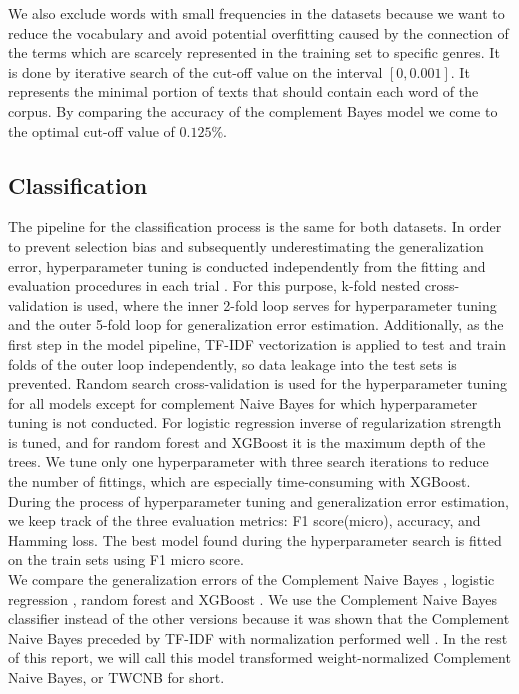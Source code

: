 \documentclass{article}
\begin{document}
We also exclude words with small frequencies in the datasets because we want to reduce the vocabulary and avoid potential overfitting caused by the connection of the terms which are scarcely represented in the training set to specific genres. It is done by iterative search of the cut-off value on the interval $[0, 0.001]$. It represents the minimal portion of texts that should contain each word of the corpus. By comparing the accuracy of the complement Bayes model we come to the optimal cut-off value of $0.125\%$.

\subsection{Classification}

The pipeline for the classification process is the same for both datasets. In order to prevent selection bias and subsequently underestimating the generalization error, hyperparameter tuning is conducted independently from the fitting and evaluation procedures in each trial \cite{cawley2010over}. For this purpose, k-fold nested cross-validation is used, where the inner 2-fold loop serves for hyperparameter tuning and the outer 5-fold loop for generalization error estimation. Additionally, as the first step in the model pipeline, TF-IDF vectorization is applied to test and train folds of the outer loop independently, so data leakage into the test sets is prevented. Random search cross-validation is used for the hyperparameter tuning for all models except for complement Naive Bayes for which hyperparameter tuning is not conducted. For logistic regression inverse of regularization strength is tuned, and for random forest and XGBoost it is the maximum depth of the trees. We tune only one hyperparameter with three search iterations to reduce the number of fittings, which are especially time-consuming with XGBoost. During the process of hyperparameter tuning and generalization error estimation, we keep track of the three evaluation metrics: F1 score(micro), accuracy, and Hamming loss. The best model found during the hyperparameter search is fitted on the train sets using F1 micro score.  \\
We compare the generalization errors of the Complement Naive Bayes \cite{rennie2003tackling}, logistic regression \cite{bishop2006pattern}, random forest \cite{ho1995random} and XGBoost \cite{chen2016xgboost}. We use the Complement Naive Bayes classifier instead of the other versions because it was shown that the Complement Naive Bayes preceded by TF-IDF with normalization performed well \cite{rennie2003tackling}. In the rest of this report, we will call this model transformed weight-normalized Complement Naive Bayes, or TWCNB for short. \\
\end{document}
